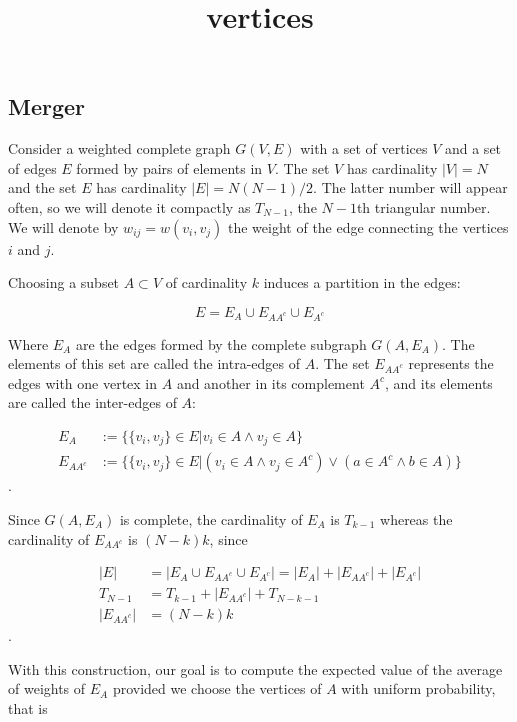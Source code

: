 \documentclass[a4paper, 10pt]{article}
\title{vertices}
\author{}
\begin{document}
\maketitle

\subsection{Merger}

Consider a weighted complete graph $G(V, E)$ with a set of vertices $V$ and a
set of edges $E$ formed by pairs of elements in $V$. The set $V$ has cardinality
$|V| = N$ and the set $E$ has cardinality $|E| = N(N-1)/2$. The latter number
will appear often, so we will denote it compactly as $T_{N-1}$, the $N-1$th
triangular number. We will denote by $w_{ij} = w(v_i, v_j)$ the weight of the
edge connecting the vertices $i$ and $j$.

Choosing a subset $A \subset V$ of cardinality $k$ induces a partition in the edges:

\begin{equation}
    E = E_A \cup E_{AA^c} \cup E_{A^c}
\end{equation}

Where $E_A$ are the edges formed by the complete subgraph $G(A, E_A)$. The 
elements of this set are called the intra-edges of $A$. The set $E_{AA^c}$
represents the edges with one vertex in $A$ and another in its complement $A^c$,
and its elements are called the inter-edges of $A$:

\begin{align}
    E_A &:= \{\{v_i, v_j\} \in E | v_i \in A \land v_j \in A\} \\
    E_{AA^c} &:= \{\{v_i, v_j\} \in E | (v_i \in A \land v_j \in A^c) \lor (a \in A^c \land b \in A)\}
    \label{eq:intra-inter-edge-def} 
\end{align}
.

Since $G(A, E_A)$ is complete, the cardinality of $E_A$ is $T_{k-1}$ whereas the cardinality of $E_{AA^c}$ is $(N-k)k$, since

\begin{align}
    |E| &= |E_A \cup E_{AA^c} \cup E_{A^c}| = |E_A| + |E_{AA^c}| + |E_{A^c}|\\
    T_{N-1} &= T_{k-1} + |E_{AA^c}| + T_{N-k-1} \\
    |E_{AA^c}| &= (N-k)k
\end{align}
.

With this construction, our goal is to compute the expected value of the average of weights of $E_A$ provided we choose the vertices of $A$ with uniform probability, that is
\end{document}

